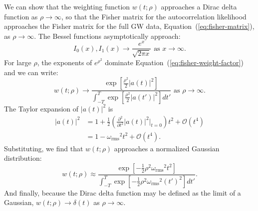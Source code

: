 \documentclass[amsmath,amssymb,aps,prx,reprint,nopreprintnumbers,nofootinbib]{revtex4-1}
\begin{document}
We can show that the weighting function $w(t; \rho)$ approaches a Dirac delta function as $\rho \rightarrow \infty$, so that the Fisher matrix for the autocorrelation likelihood approaches the Fisher matrix for the full \ac{GW} data, Equation~(\ref{eq:fisher-matrix}), as $\rho \rightarrow \infty$. The Bessel functions asymptotically approach:
%
\begin{equation*}
    I_0(x), I_1(x) \rightarrow \frac{e^x}{\sqrt{2 \pi x}}
    \textrm{ as } x \rightarrow \infty.
\end{equation*}
%
For large $\rho$, the exponents of $e^{\rho^2}$ dominate Equation~(\ref{eq:fisher-weight-factor}) and we can write:
%
\begin{equation*}
    w(t; \rho) \rightarrow \frac{
        \displaystyle
        \exp\left[\frac{\rho^2}{2}|a(t)|^2\right]
    }{
        \displaystyle
        \int_{-T}^T \exp\left[\frac{\rho^2}{2}|a(t')|^2\right] dt'
    }
    \textrm{ as } \rho \rightarrow \infty.
\end{equation*}
%
The Taylor expansion of $|a(t)|^2$ is
%
\begin{align}
    \nonumber
    |a(t)|^2 &= 1 + \frac{1}{2} \left(\frac{\partial^2}{\partial t^2}|a(t)|^2 \Bigg|_{t=0}\right) t^2 + \mathcal{O}(t^4) \\
    \nonumber
    &= 1 - {\omega_\mathrm{rms}}^2 t^2 + \mathcal{O}(t^4).
\end{align}
%
Substituting, we find that $w(t; \rho)$ approaches a normalized Gaussian distribution:
%
\begin{equation*}
    w(t; \rho) \approx \frac{
        \displaystyle
        \exp\left[-\frac{1}{2} \rho^2 {\omega_\mathrm{rms}}^2 t^2\right]
    }{
        \displaystyle
        \int_{-T}^T \exp\left[-\frac{1}{2} \rho^2 {\omega_\mathrm{rms}}^2 (t')^2\right] dt'
    }.
\end{equation*}
%
And finally, because the Dirac delta function may be defined as the limit of a Gaussian, $w(t; \rho) \rightarrow \delta(t)$ as $\rho \rightarrow \infty$.
\end{document}
